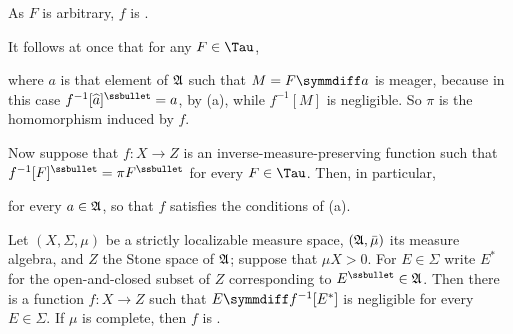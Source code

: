 {

\noindent As $F$ is arbitrary, $f$ is \imp.\ \Qed

It follows at once that for any $F\in\Tau$,

\noindent where $a$ is that element of $\frak A$ such that $M=F\symmdiff
a$ is meager, because in this case $f^{-1}[\widehat{a}]^{\ssbullet}=a$,
by (a), while $f^{-1}[M]$ is negligible.   So $\pi$ is the
homomorphism induced by $f$.

\medskip

 Now suppose that $f:X\to Z$ is an
inverse-measure-preserving function such that $f^{-1}[F]^{\ssbullet}=\pi
F^{\ssbullet}$ for every $F\in\Tau$.   Then, in particular,


\noindent for every $a\in\frak A$, so that $f$ satisfies the conditions
of (a).
}%

 Let $(X,\Sigma,\mu)$ be a strictly
localizable measure space, $(\frak A,\bar\mu)$ its measure algebra, and
$Z$ the Stone space of $\frak A$;  suppose that $\mu X>0$.   For
$E\in\Sigma$ write $E^*$ for the
open-and-closed subset of $Z$ corresponding to
$E^{\ssbullet}\in\frak A$.   Then there is a function $f:X\to Z$ such
that $E\symmdiff f^{-1}[E^*]$ is negligible for every $E\in\Sigma$.
If $\mu$ is complete, then $f$ is \imp.


